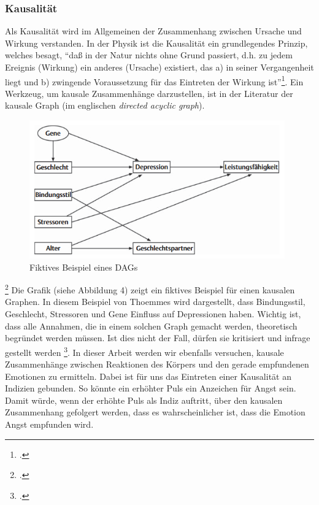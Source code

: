 \subsubsection{Kausalität}
Als Kausalität wird im Allgemeinen der Zusammenhang zwischen Ursache und Wirkung verstanden. In der Physik ist die Kausalität ein grundlegendes Prinzip, welches besagt, ``daß in der Natur nichts ohne Grund passiert, d.h. zu jedem Ereignis (Wirkung) ein anderes (Ursache) existiert, das a) in seiner Vergangenheit liegt und b) zwingende Voraussetzung für das Eintreten der Wirkung ist''\footcite{Sav18}.\newline
Ein Werkzeug, um kausale Zusammenhänge darzustellen, ist in der Literatur der kausale Graph (im englischen \textit{directed acyclic graph}).
\begin{figure}[h]
	\centering
	\includegraphics[width=11cm]{Bilder/dag.png}
	\caption[Fiktives Beispiel eines DAGs]{Fiktives Beispiel eines DAGs\footnotemark}
\end{figure}
\footcite[Vgl.][Kausale Graphen - DAGs]{Tho11}
Die Grafik (siehe Abbildung 4) zeigt ein fiktives Beispiel für einen kausalen Graphen. In diesem Beispiel von Thoemmes wird dargestellt, dass Bindungsstil, Geschlecht, Stressoren und Gene Einfluss auf Depressionen haben. Wichtig ist, dass alle Annahmen, die in einem solchen Graph gemacht werden, theoretisch begründet werden müssen. Ist dies nicht der Fall, dürfen sie kritisiert und infrage gestellt werden \footcite[Vgl. ][S.3 Kausale Graphen - DAGs]{Tho11}.\newline
In dieser Arbeit werden wir ebenfalls versuchen, kausale Zusammenhänge zwischen Reaktionen des Körpers und den gerade empfundenen Emotionen zu ermitteln. Dabei ist für uns das Eintreten einer Kausalität an Indizien gebunden. So könnte ein erhöhter Puls ein Anzeichen für Angst sein. Damit würde, wenn der erhöhte Puls als Indiz auftritt, über den kausalen Zusammenhang gefolgert werden, dass es wahrscheinlicher ist, dass die Emotion Angst empfunden wird. 
